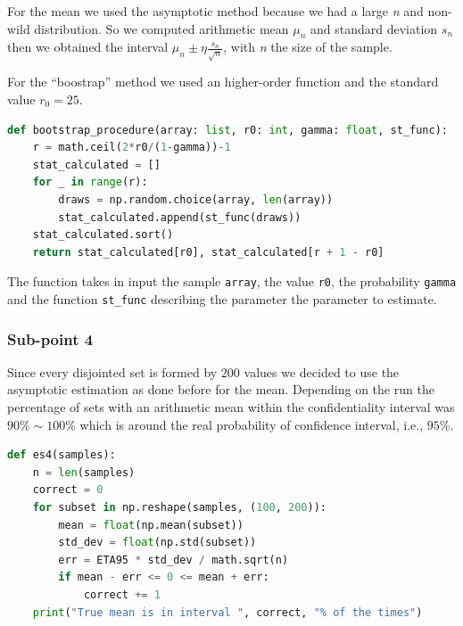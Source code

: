 \documentclass[10pt,a4paper]{article}
\begin{document}
For the mean we used the asymptotic method because we had a large \emph{n} and non-wild distribution. So we computed arithmetic mean \(\mu_{n}\) and standard deviation \(s_{n}\) then we obtained the interval \(\mu_{n}\pm \eta\frac{s_{n}}{\sqrt{n}}\), with \emph{n} the size of the sample.

For the ``boostrap'' method we used an higher-order function and the standard value \(r_{0} = 25\).
\begin{lstlisting}[language=python]
def bootstrap_procedure(array: list, r0: int, gamma: float, st_func):
    r = math.ceil(2*r0/(1-gamma))-1
    stat_calculated = []
    for _ in range(r):
        draws = np.random.choice(array, len(array))
        stat_calculated.append(st_func(draws))
    stat_calculated.sort()
    return stat_calculated[r0], stat_calculated[r + 1 - r0]
\end{lstlisting}
The function takes in input the sample \texttt{array}, the value \texttt{r0}, the probability \texttt{gamma} and the function \texttt{st\_func} describing the parameter the parameter to estimate.

\subsubsection*{Sub-point 4}

Since every disjointed set is formed by \(200\) values we decided to use the asymptotic estimation as done before for the mean. Depending on the run the percentage of sets with an arithmetic mean within the confidentiality interval was \(90\%\sim100\%\) which is around the real probability of confidence interval, i.e., \(95\%\).
\begin{lstlisting}[language=python]
def es4(samples):
    n = len(samples)
    correct = 0
    for subset in np.reshape(samples, (100, 200)):
        mean = float(np.mean(subset))
        std_dev = float(np.std(subset))
        err = ETA95 * std_dev / math.sqrt(n)
        if mean - err <= 0 <= mean + err:
            correct += 1
    print("True mean is in interval ", correct, "% of the times")
\end{lstlisting}
\end{document}
